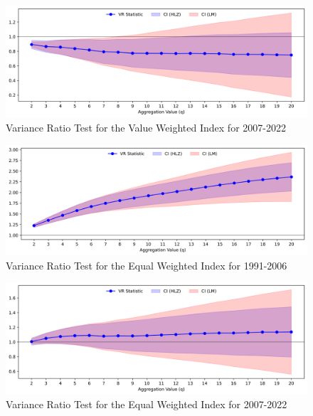 \documentclass[12pt,twoside]{article}
\begin{document}
\begin{solution}
    \begin{figure}[!htbp]
        \centering
        \caption{Variance Ratio Test for the Value Weighted Index for 2007-2022}
        \label{fig:vrtest_value_0722}
        \includegraphics[width=1\textwidth]{images/vrtest_value_0722.png}
    \end{figure}
    \begin{figure}[!htbp]
        \centering
        \caption{Variance Ratio Test for the Equal Weighted Index for 1991-2006}
        \label{fig:vrtest_equal_9106}
        \includegraphics[width=1\textwidth]{images/vrtest_equal_9106.png}
    \end{figure}
    \begin{figure}[!htbp]
        \centering
        \caption{Variance Ratio Test for the Equal Weighted Index for 2007-2022}
        \label{fig:vrtest_equal_0722}
        \includegraphics[width=1\textwidth]{images/vrtest_equal_0722.png}
    \end{figure}
\end{solution} 

\newpage
$ $\clearpage


\end{document}
